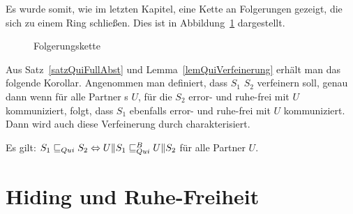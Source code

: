Es wurde somit, wie im letzten Kapitel, eine Kette an Folgerungen gezeigt, die
sich zu einem Ring schließen. Dies ist in Abbildung~\ref{FolgerungsketteQui}
dargestellt.

\begin{figure}[h!tbp]
  \begin{center}
    \caption{Folgerungskette}
    \label{FolgerungsketteQui}
  \end{center}
\end{figure}

Aus Satz~\ref{satzQuiFullAbst} und Lemma~\ref{lemQuiVerfeinerung} erhält man
das folgende Korollar. Angenommen man definiert, dass $S_1$ $S_2$ verfeinern
soll, genau dann wenn für alle Partner \EIO{}s $U$, für die $S_2$ error- und
ruhe-frei mit $U$ kommuniziert, folgt, dass $S_1$ ebenfalls error- und
ruhe-frei mit $U$ kommuniziert. Dann wird auch diese Verfeinerung durch \QRel{}
charakterisiert.

\begin{kor}
  Es gilt: $S_1\sqsubseteq _{Qui} S_2\Leftrightarrow U\|S_1\sqsubseteq _{Qui}^B U\|S_2$ für alle Partner
  $U$.
\end{kor}

\section{Hiding und Ruhe-Freiheit}

